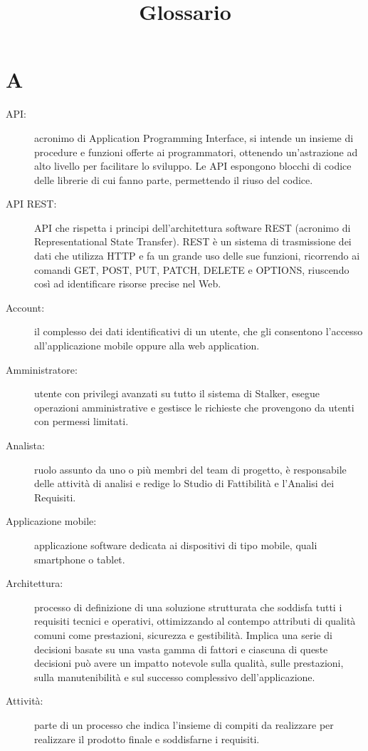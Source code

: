 \documentclass{article}
\title{Glossario}
\begin{document}


  \section{A}
  \begin{description}
    \item[API:] acronimo di Application Programming Interface, si intende un insieme di procedure e funzioni offerte ai programmatori, ottenendo un'astrazione ad alto livello per facilitare lo sviluppo. Le API espongono blocchi di codice delle librerie di cui fanno parte, permettendo il riuso del codice.
    \item[API REST:] API che rispetta i principi dell'architettura software REST (acronimo di Representational State Transfer). REST è un sistema di trasmissione dei dati che utilizza HTTP e fa un grande uso delle sue funzioni, ricorrendo ai comandi GET, POST, PUT, PATCH, DELETE e OPTIONS, riuscendo così ad identificare risorse precise nel Web.
    \item[Account:] il complesso dei dati identificativi di un utente, che gli consentono l'accesso all'applicazione mobile oppure alla web application.
    \item[Amministratore:] utente con privilegi avanzati su tutto il sistema di Stalker, esegue operazioni amministrative e gestisce le richieste che provengono da utenti con permessi limitati.
    \item[Analista:] ruolo assunto da uno o più membri del team di progetto, è responsabile delle attività di analisi e redige lo Studio di Fattibilità e l'Analisi dei Requisiti.
    \item[Applicazione mobile:] applicazione software dedicata ai dispositivi di tipo mobile, quali smartphone o tablet.
    \item[Architettura:] processo di definizione di una soluzione strutturata che soddisfa tutti i requisiti tecnici e operativi, ottimizzando al contempo attributi di qualità comuni come prestazioni, sicurezza e gestibilità. Implica una serie di decisioni basate su una vasta gamma di fattori e ciascuna di queste decisioni può avere un impatto notevole sulla qualità, sulle prestazioni, sulla manutenibilità e sul successo complessivo dell'applicazione.
    \item[Attività:] parte di un processo che indica l'insieme di compiti da realizzare per realizzare il prodotto finale e soddisfarne i requisiti.
  \end{description}
  \newpage
\end{document}
